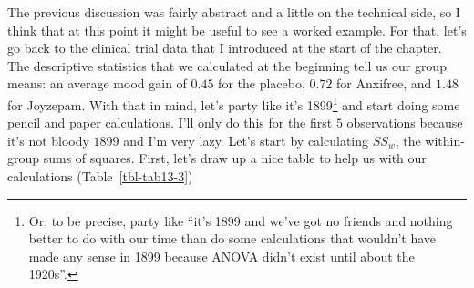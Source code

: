 \documentclass[
  a4paper,
]{book}
\begin{document}
The previous discussion was fairly abstract and a little on the
technical side, so I think that at this point it might be useful to see
a worked example. For that, let's go back to the clinical trial data
that I introduced at the start of the chapter. The descriptive
statistics that we calculated at the beginning tell us our group means:
an average mood gain of \(0.45\) for the placebo, \(0.72\) for Anxifree,
and \(1.48\) for Joyzepam. With that in mind, let's party like it's
1899\footnote{Or, to be precise, party like ``it's 1899 and we've got no
  friends and nothing better to do with our time than do some
  calculations that wouldn't have made any sense in 1899 because ANOVA
  didn't exist until about the 1920s''.} and start doing some pencil and
paper calculations. I'll only do this for the first \(5\) observations
because it's not bloody \(1899\) and I'm very lazy. Let's start by
calculating \(SS_w\), the within-group sums of squares. First, let's
draw up a nice table to help us with our calculations
(Table~\ref{tbl-tab13-3})

\hypertarget{tbl-tab13-3}{}
 
  \providecommand{\huxb}[2]{\arrayrulecolor[RGB]{#1}\global\arrayrulewidth=#2pt}
  \providecommand{\huxvb}[2]{\color[RGB]{#1}\vrule width #2pt}
  \providecommand{\huxtpad}[1]{\rule{0pt}{#1}}
  \providecommand{\huxbpad}[1]{\rule[-#1]{0pt}{#1}}
\end{document}
